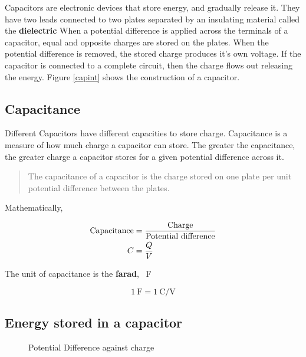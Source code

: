 \documentclass{scrbook}
\begin{document}
	Capacitors are electronic devices that store energy, and gradually release it. They have two leads connected to two plates separated by an insulating material called the \textbf{dielectric} When a potential difference is applied across the terminals of a capacitor, equal and opposite charges are stored on the plates. When the potential difference is removed, the stored charge produces it's own voltage. If the capacitor is connected to a complete circuit, then the charge flows out releasing the energy. Figure \ref{capint} shows the construction of a capacitor.

\subsection{Capacitance}

	Different Capacitors have different capacities to store charge. Capacitance is a measure of how much charge a capacitor can store. The greater the capacitance, the greater charge a capacitor stores for a given potential difference across it.

	\begin{quote}
		The capacitance of a capacitor is the charge stored on one plate per unit potential difference between the plates.
	\end{quote}

	Mathematically,

	\begin{align}
		\text{Capacitance} &= \frac{\text{Charge}}{\text{Potential difference}} \notag \\
		C &= \frac{Q}{V} \label{capacitanceeq}
	\end{align}

	The unit of capacitance is the \textbf{farad}, \SI{}{\farad}

	\[ \SI{1}{\farad} = \SI{1}{\coulomb\per\volt} \]

\subsection{Energy stored in a capacitor}

	\begin{figure}
	\caption{Potential Difference against charge}
	\centering
	\label{pdvcap}
	\end{figure}
	
\end{document}
